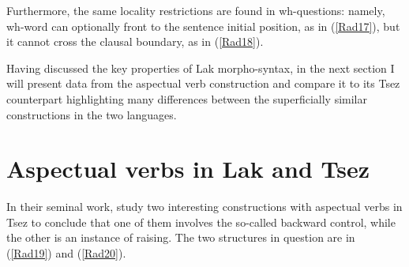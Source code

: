 \documentclass[output=paper]{langscibook}
\begin{document}
Furthermore, the same locality restrictions are found in wh-questions: namely, wh-word can optionally front to the sentence initial position, as in (\ref{Rad17}),  but it cannot cross the clausal boundary, as in (\ref{Rad18}).

\ea\label{Rad17}
\z
\z

\ea\label{Rad18}



\z
\z

Having discussed the key properties of Lak morpho-syntax, in the next section I will present data from the aspectual verb construction and compare it to its Tsez counterpart highlighting many differences between the superficially similar constructions in the two languages.\\

\section{Aspectual verbs in Lak and Tsez}\label{Radsect:3}
In their seminal work, \citet{PolinskyPotsdam2002} study two interesting constructions with aspectual verbs in Tsez to conclude that one of them involves the so-called backward control, while the other is an instance of raising. The two structures in question are in (\ref{Rad19}) and (\ref{Rad20}). 
\end{document}
